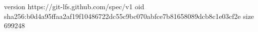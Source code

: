 version https://git-lfs.github.com/spec/v1
oid sha256:b0d4a95ffaa2af19f10486722dc55c9bc070abfce7b81658089dcb8c1e03cf2e
size 699248
